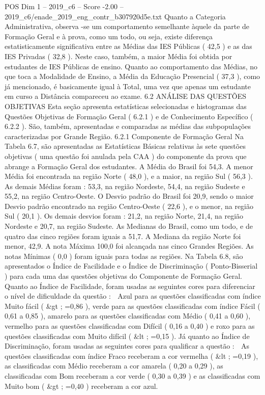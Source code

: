\begin{textsample}{POS Dim 1 – 2019\_c6 – Score -2.00 – 2019\_c6/enade\_2019\_eng\_contr\_b307920d5e.txt}
Quanto a Categoria Administrativa, observa -se um comportamento semelhante àquele da parte de Formação Geral e à prova, como um todo, ou seja, existe diferença estatisticamente significativa entre as Médias das IES Públicas ( 42,5 ) e as das IES Privadas ( 32,8 ).
Neste caso, também, a maior Média foi obtida por estudantes de IES Públicas de ensino.
Quanto ao comportamento das Médias, no que toca a Modalidade de Ensino, a Média da Educação Presencial ( 37,3 ), como já mencionado, é basicamente igual à Total, uma vez que apenas um estudante em curso a Distância compareceu ao exame. 6.2 ANÁLISE DAS QUESTÕES OBJETIVAS Esta seção apresenta estatísticas selecionadas e histogramas das Questões Objetivas de Formação Geral ( 6.2.1 ) e de Conhecimento Específico ( 6.2.2 ).
São, também, apresentadas e comparadas as médias das subpopulações caracterizadas por Grande Região. 6.2.1 Componente de Formação Geral Na Tabela 6.7, são apresentadas as Estatísticas Básicas relativas às sete questões objetivas ( uma questão foi anulada pela CAA ) do componente da prova que abrange a Formação Geral dos estudantes.
A Média do Brasil foi 54,3.
A menor Média foi encontrada na região Norte ( 48,0 ), e a maior, na região Sul ( 56,3 ).
As demais Médias foram : 53,3, na região Nordeste, 54,4, na região Sudeste e 55,2, na região Centro-Oeste.
O Desvio padrão do Brasil foi 20,9, sendo o maior Desvio padrão encontrado na região Centro-Oeste ( 22,6 ), e o menor, na região Sul ( 20,1 ).
Os demais desvios foram : 21,2, na região Norte, 21,4, na região Nordeste e 20,7, na região Sudeste.
As Medianas do Brasil, como um todo, e de quatro das cinco regiões foram iguais a 51,7.
A Mediana da região Norte foi menor, 42,9.
A nota Máxima 100,0 foi alcançada nas cinco Grandes Regiões.
As notas Mínimas ( 0,0 ) foram iguais para todas as regiões.
Na Tabela 6.8, são apresentados o Índice de Facilidade e o Índice de Discriminação ( Ponto-Bisserial ) para cada uma das questões objetivas do Componente de Formação Geral.
Quanto ao Índice de Facilidade, foram usadas as seguintes cores para diferenciar o nível de dificuldade da questão :  Azul para as questões classificadas com índice Muito fácil ( \&gt ; =0,86 ), verde para as questões classificadas com índice Fácil ( 0,61 a 0,85 ), amarelo para as questões classificadas com Médio ( 0,41 a 0,60 ), vermelho para as questões classificadas com Difícil ( 0,16 a 0,40 ) e roxo para as questões classificadas com Muito difícil ( \&lt ; =0,15 ).
Já quanto ao Índice de Discriminação, foram usadas as seguintes cores para qualificar a questão :  As questões classificadas com índice Fraco receberam a cor vermelha ( \&lt ; =0,19 ), as classificadas com Médio receberam a cor amarela ( 0,20 a 0,29 ), as classificadas com Bom receberam a cor verde ( 0,30 a 0,39 ) e as classificadas com Muito bom ( \&gt ; =0,40 ) receberam a cor azul.

\end{textsample}
